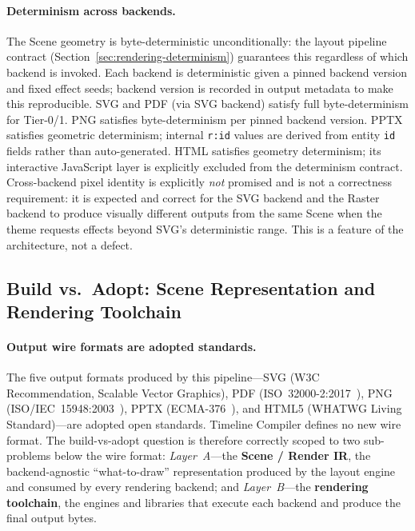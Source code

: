 \paragraph{Determinism across backends.}
The Scene geometry is byte-deterministic unconditionally: the layout pipeline contract
(Section~\ref{sec:rendering-determinism}) guarantees this regardless of which backend is
invoked. Each backend is deterministic given a pinned backend version and fixed effect
seeds; backend version is recorded in output metadata to make this reproducible. SVG and
PDF (via SVG backend) satisfy full byte-determinism for Tier-0/1. PNG satisfies
byte-determinism per pinned backend version. PPTX satisfies geometric determinism;
internal \texttt{r:id} values are derived from entity \texttt{id} fields rather than
auto-generated. HTML satisfies geometry determinism; its interactive JavaScript layer is
explicitly excluded from the determinism contract. Cross-backend pixel identity is
explicitly \emph{not} promised and is not a correctness requirement: it is expected and
correct for the SVG backend and the Raster backend to produce visually different outputs
from the same Scene when the theme requests effects beyond SVG's deterministic range.
This is a feature of the architecture, not a defect.


\subsection{Build vs.\ Adopt: Scene Representation and Rendering Toolchain}
\label{sec:build-vs-adopt-render}

\paragraph{Output wire formats are adopted standards.}
The five output formats produced by this pipeline---SVG (W3C Recommendation,
Scalable Vector Graphics), PDF (ISO~32000-2:2017~\cite{pdf-iso32000}), PNG
(ISO/IEC~15948:2003~\cite{png-spec}), PPTX (ECMA-376~\cite{ooxml}), and HTML5
(WHATWG Living Standard)---are adopted open standards.
Timeline Compiler defines no new wire format.
The build-vs-adopt question is therefore correctly scoped to two sub-problems
below the wire format: \emph{Layer~A}---the \textbf{Scene / Render IR}, the
backend-agnostic ``what-to-draw'' representation produced by the layout engine
and consumed by every rendering backend; and \emph{Layer~B}---the
\textbf{rendering toolchain}, the engines and libraries that execute each
backend and produce the final output bytes.

